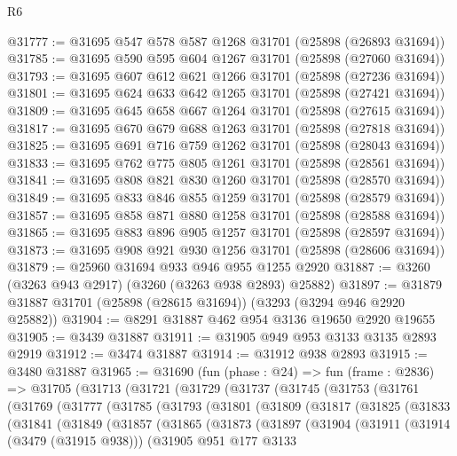 \begin{lexlean}{R6}
\begin{coremodule}
@31777 := @31695 @547 @578 @587 @1268 @31701 (@25898 (@26893 @31694))
@31785 := @31695 @590 @595 @604 @1267 @31701 (@25898 (@27060 @31694))
@31793 := @31695 @607 @612 @621 @1266 @31701 (@25898 (@27236 @31694))
@31801 := @31695 @624 @633 @642 @1265 @31701 (@25898 (@27421 @31694))
@31809 := @31695 @645 @658 @667 @1264 @31701 (@25898 (@27615 @31694))
@31817 := @31695 @670 @679 @688 @1263 @31701 (@25898 (@27818 @31694))
@31825 := @31695 @691 @716 @759 @1262 @31701 (@25898 (@28043 @31694))
@31833 := @31695 @762 @775 @805 @1261 @31701 (@25898 (@28561 @31694))
@31841 := @31695 @808 @821 @830 @1260 @31701 (@25898 (@28570 @31694))
@31849 := @31695 @833 @846 @855 @1259 @31701 (@25898 (@28579 @31694))
@31857 := @31695 @858 @871 @880 @1258 @31701 (@25898 (@28588 @31694))
@31865 := @31695 @883 @896 @905 @1257 @31701 (@25898 (@28597 @31694))
@31873 := @31695 @908 @921 @930 @1256 @31701 (@25898 (@28606 @31694))
@31879 := @25960 @31694 @933 @946 @955 @1255 @2920
@31887 := @3260 (@3263 @943 @2917) (@3260 (@3263 @938 @2893) @25882)
@31897 := @31879 @31887 @31701 (@25898 (@28615 @31694)) (@3293 (@3294 @946 @2920 @25882))
@31904 := @8291 @31887 @462 @954 @3136 @19650 @2920 @19655
@31905 := @3439 @31887
@31911 := @31905 @949 @953 @3133 @3135 @2893 @2919
@31912 := @3474 @31887
@31914 := @31912 @938 @2893
@31915 := @3480 @31887
@31965 := @31690
    (fun (phase : @24) =>
    fun (frame : @2836) =>
    @31705
      (@31713
        (@31721
          (@31729
            (@31737
              (@31745
                (@31753
                  (@31761
                    (@31769
                      (@31777
                        (@31785
                          (@31793
                            (@31801
                              (@31809
                                (@31817
                                  (@31825
                                    (@31833
                                      (@31841
                                        (@31849
                                          (@31857
                                            (@31865
                                              (@31873
                                                (@31897
                                                  (@31904
                                                    (@31911
                                                      (@31914 (@3479 (@31915 @938)))
                                                      (@31905
                                                        @951
                                                        @177
                                                        @3133

\end{coremodule}
\end{lexlean}
